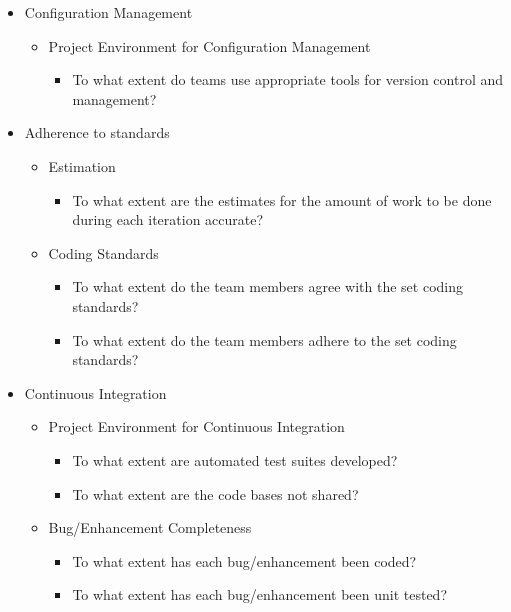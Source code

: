 \begin{appendices}
\begin{itemize}
\begin{itemize}
		\end{itemize}
	\item Configuration Management
		\begin{itemize}
			\item Project Environment for Configuration Management
				\begin{itemize}
					\item To what extent do teams use appropriate tools for version control and management?
				\end{itemize}
		\end{itemize}
	\item Adherence to standards
		\begin{itemize}
			\item Estimation
				\begin{itemize}
					\item To what extent are the estimates for the amount of work to be done during each iteration accurate?
				\end{itemize}
			\item Coding Standards
				\begin{itemize}
					\item To what extent do the team members agree with the set coding standards? 
					\item To what extent do the team members adhere to the set coding standards?
				\end{itemize}
		\end{itemize}
	\item Continuous Integration
		\begin{itemize}
			\item Project Environment for Continuous Integration 
				\begin{itemize}
					\item To what extent are automated test suites developed?
					\item To what extent are the code bases not shared?
				\end{itemize}
			\item Bug/Enhancement Completeness
				\begin{itemize}
					\item To what extent has each bug/enhancement been coded? 
					\item To what extent has each bug/enhancement been unit tested? 

\end{itemize}
\end{itemize}
\end{itemize}
\end{appendices}
